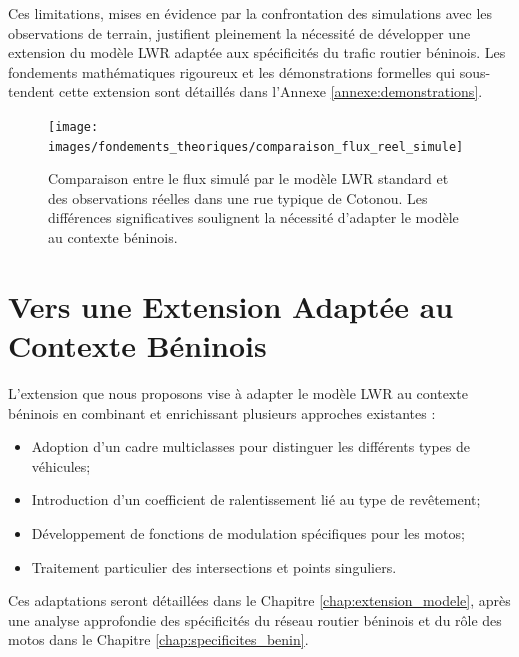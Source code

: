 Ces limitations, mises en évidence par la confrontation des simulations avec les observations de terrain, justifient pleinement la nécessité de développer une extension du modèle LWR adaptée aux spécificités du trafic routier béninois. Les fondements mathématiques rigoureux et les démonstrations formelles qui sous-tendent cette extension sont détaillés dans l'Annexe \ref{annexe:demonstrations}.

\begin{figure}[htbp]
\centering
\texttt{[image: images/fondements\_theoriques/comparaison\_flux\_reel\_simule]}
\caption{Comparaison entre le flux simulé par le modèle LWR standard et des observations réelles dans une rue typique de Cotonou. Les différences significatives soulignent la nécessité d'adapter le modèle au contexte béninois.}
\label{fig:comparaison_flux}
\end{figure}

\section{Vers une Extension Adaptée au Contexte Béninois}
\label{sec:vers_extension}

L'extension que nous proposons vise à adapter le modèle LWR au contexte béninois en combinant et enrichissant plusieurs approches existantes :

\begin{itemize}
\item Adoption d'un cadre multiclasses pour distinguer les différents types de véhicules;
\item Introduction d'un coefficient de ralentissement lié au type de revêtement;
\item Développement de fonctions de modulation spécifiques pour les motos;
\item Traitement particulier des intersections et points singuliers.
\end{itemize}

Ces adaptations seront détaillées dans le Chapitre \ref{chap:extension_modele}, après une analyse approfondie des spécificités du réseau routier béninois et du rôle des motos dans le Chapitre \ref{chap:specificites_benin}.
